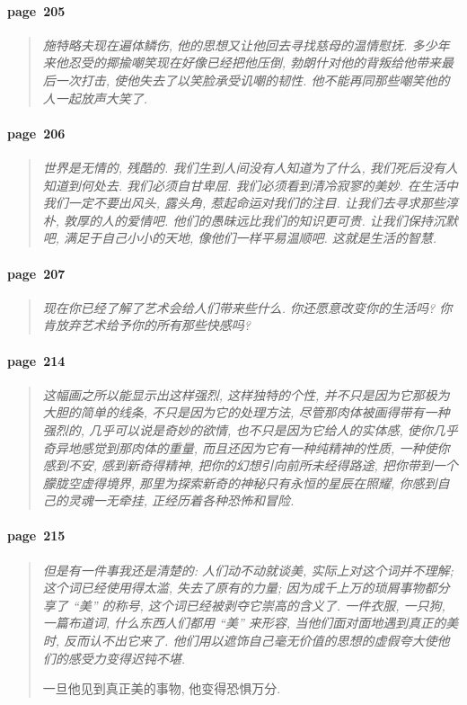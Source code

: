 \paragraph*{page~205}
\begin{quotation}
    \itshape
    施特略夫现在遍体鳞伤, 他的思想又让他回去寻找慈母的温情慰抚. 多少年来他忍受的揶揄嘲笑现在好像已经把他压倒, 勃朗什对他的背叛给他带来最后一次打击, 使他失去了以笑脸承受讥嘲的韧性. 他不能再同那些嘲笑他的人一起放声大笑了. 
\end{quotation}

\paragraph*{page~206}
\begin{quotation}
    \itshape
    世界是无情的, 残酷的. 我们生到人间没有人知道为了什么, 我们死后没有人知道到何处去. 我们必须自甘卑屈. 我们必须看到清冷寂寥的美妙. 在生活中我们一定不要出风头, 露头角, 惹起命运对我们的注目. 让我们去寻求那些淳朴, 敦厚的人的爱情吧. 他们的愚昧远比我们的知识更可贵. 让我们保持沉默吧, 满足于自己小小的天地, 像他们一样平易温顺吧. 这就是生活的智慧. 
\end{quotation}

\paragraph*{page~207}
\begin{quotation}
    \itshape
    现在你已经了解了艺术会给人们带来些什么. 你还愿意改变你的生活吗? 你肯放弃艺术给予你的所有那些快感吗?
\end{quotation}

\paragraph*{page~214}
\begin{quotation}
    \itshape
    这幅画之所以能显示出这样强烈, 这样独特的个性, 并不只是因为它那极为大胆的简单的线条, 不只是因为它的处理方法, 尽管那肉体被画得带有一种强烈的, 几乎可以说是奇妙的欲情, 也不只是因为它给人的实体感, 使你几乎奇异地感觉到那肉体的重量, 而且还因为它有一种纯精神的性质, 一种使你感到不安, 感到新奇得精神, 把你的幻想引向前所未经得路途, 把你带到一个朦胧空虚得境界, 那里为探索新奇的神秘只有永恒的星辰在照耀, 你感到自己的灵魂一无牵挂, 正经历着各种恐怖和冒险. 
\end{quotation}

\paragraph*{page~215}
\begin{quotation}
    \itshape
    但是有一件事我还是清楚的: 人们动不动就谈美, 实际上对这个词并不理解; 这个词已经使用得太滥, 失去了原有的力量; 因为成千上万的琐屑事物都分享了 ``美'' 的称号, 这个词已经被剥夺它崇高的含义了. 一件衣服, 一只狗, 一篇布道词, 什么东西人们都用 ``美'' 来形容, 当他们面对面地遇到真正的美时, 反而认不出它来了. 他们用以遮饰自己毫无价值的思想的虚假夸大使他们的感受力变得迟钝不堪. 

    一旦他见到真正美的事物, 他变得恐惧万分. 
\end{quotation}

